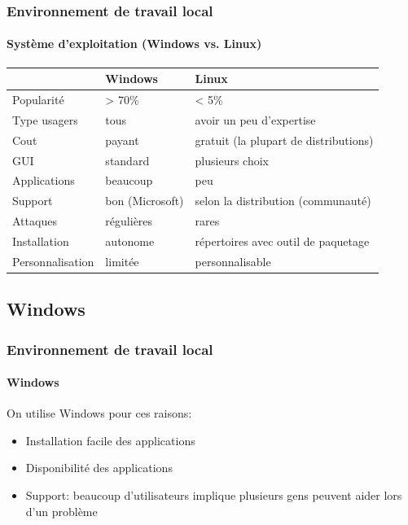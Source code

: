 \documentclass{beamer}
\begin{document}
\begin{frame}
\frametitle{Environnement de travail local}
\framesubtitle{Système d'exploitation (Windows vs. Linux)}


\begin{tabular}{p{}p{}p{}}
	\hline\hline
	& Windows & Linux \\
	\hline\hline
	
	Popularité & > 70\% & < 5\% \\
	\hline
	
	Type usagers & tous & avoir un peu d'expertise \\
	\hline
	
	Cout & payant & gratuit (la plupart de distributions) \\
	\hline
	
	GUI & standard & plusieurs choix \\
	\hline
	
	Applications & beaucoup & peu\\
	\hline
	
	Support & bon (Microsoft) & selon la distribution (communauté) \\
	\hline
	
	Attaques & régulières & rares\\
	\hline
	
	Installation & autonome & répertoires avec outil de paquetage \\
	\hline
	
	Personnalisation & limitée & personnalisable \\
	\hline\hline
\end{tabular}

\end{frame}

\subsection{Windows}

\begin{frame}
\frametitle{Environnement de travail local}
\framesubtitle{Windows}

On utilise Windows pour ces raisons:
\begin{itemize}
	\item Installation facile des applications
	\item Disponibilité des applications 
	\item Support: beaucoup d'utilisateurs implique plusieurs gens peuvent aider lors d'un problème
\end{itemize}

\end{frame}
\end{document}
